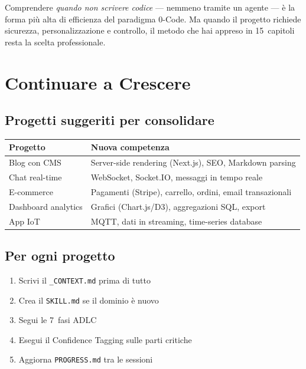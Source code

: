 \begin{notebox}
Comprendere \textit{quando non scrivere codice} --- nemmeno tramite un agente --- è la forma più alta di efficienza del paradigma 0-Code. Ma quando il progetto richiede sicurezza, personalizzazione e controllo, il metodo che hai appreso in 15~capitoli resta la scelta professionale.
\end{notebox}

\section{Continuare a Crescere}

\subsection{Progetti suggeriti per consolidare}

\begin{center}
\begin{tabularx}{\textwidth}{l X}
\toprule
\textbf{Progetto} & \textbf{Nuova competenza} \\
\midrule
Blog con CMS & Server-side rendering (Next.js), SEO, Markdown parsing \\
Chat real-time & WebSocket, Socket.IO, messaggi in tempo reale \\
E-commerce & Pagamenti (Stripe), carrello, ordini, email transazionali \\
Dashboard analytics & Grafici (Chart.js/D3), aggregazioni SQL, export \\
App IoT & MQTT, dati in streaming, time-series database \\
\bottomrule
\end{tabularx}
\end{center}

\subsection{Per ogni progetto}

\begin{enumerate}
  \item Scrivi il \texttt{\_CONTEXT.md} prima di tutto
  \item Crea il \texttt{SKILL.md} se il dominio è nuovo
  \item Segui le 7~fasi ADLC
  \item Esegui il Confidence Tagging sulle parti critiche
  \item Aggiorna \texttt{PROGRESS.md} tra le sessioni
\end{enumerate}

